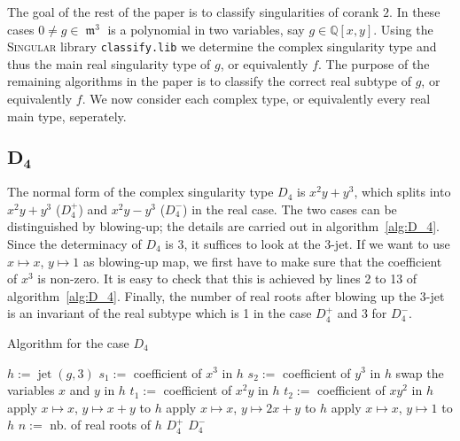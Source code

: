 \documentclass[noend]{amsproc}
\DeclareMathOperator{\m}{\mathfrak{m}}
\DeclareMathOperator{\jet}{jet}
\begin{document}
The goal of the rest of the paper is to classify singularities of corank $2$.
In these cases $0\neq g\in\m^3$ is a polynomial in two variables, say
$g\in\mathbb Q[x,y]$. Using the \textsc{Singular} library {\tt classify.lib} we
determine the complex singularity type and thus the main real singularity type
of $g$, or equivalently $f$. The purpose of the remaining algorithms in the
paper is to classify the correct real subtype of $g$, or equivalently $f$. We
now consider each complex type, or equivalently every real main type,
seperately.

\subsection{$\boldsymbol{D_4}$}

The normal form of the complex singularity type $D_4$ is $x^2y+y^3$, which
splits into $x^2y+y^3$ ($D_4^+$) and $x^2y-y^3$ ($D_4^-$) in the real case.
The two cases can be distinguished by blowing-up; the details are carried out
in algorithm~\ref{alg:D_4}. Since the determinacy of
$D_4$ is $3$, it suffices to look at the $3$-jet. If we want to use
$x \mapsto x$, $y \mapsto 1$ as blowing-up map, we first have to make sure that
the coefficient of $x^3$ is non-zero. It is easy to check that this is achieved
by lines 2 to 13 of algorithm~\ref{alg:D_4}. Finally, the number of real roots
after blowing up the 3-jet is an invariant of the real subtype which is 1 in
the case $D_4^+$ and 3 for $D_4^-$.

\begin{algorithm}[h]
\caption{\label{alg:D_4}\label{D[4]} Algorithm for the case $D_4$}
\begin{algorithmic}[1]

\REQUIRE{$g\in \m^3\subset\mathbb Q[x,y]$ of complex singularity type $D_4$}
\STATE $h := \jet(g,3)$
\STATE $s_1:=$ coefficient of ${x^3}$ in $h$
\STATE $s_2 :=$ coefficient of ${y^3}$ in $h$
\STATE swap the variables $x$ and $y$ in $h$
\ELSE
\STATE $t_1:=$ coefficient of ${x^2y}$ in $h$
\STATE $t_2:=$ coefficient of ${xy^2}$ in $h$
\STATE apply $x\mapsto x$, $y\mapsto x+y$ to $h$
\ELSE
\STATE apply $x\mapsto x$, $y\mapsto 2x+y$ to $h$
\ENDIF
\ENDIF
\ENDIF
\STATE apply $x\mapsto x$, $y\mapsto 1$ to $h$
\STATE $n :=$ nb. of real roots of $h$
\RETURN $D_4^+$
\ELSE
\RETURN $D_4^-$
\ENDIF

\end{algorithmic}
\end{algorithm}
\end{document}
